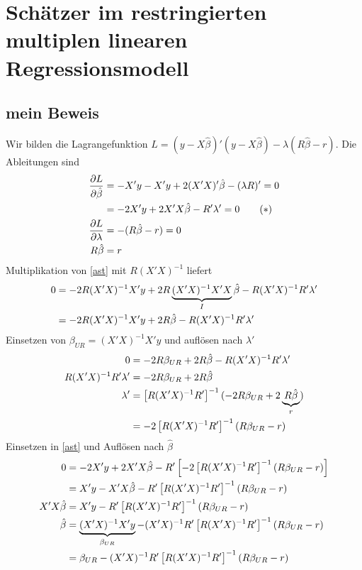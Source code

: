 \documentclass{article}
\begin{document}
	\section{Schätzer im restringierten multiplen linearen Regressionsmodell}
	\subsection{mein Beweis}
	Wir bilden die Lagrangefunktion $L=(y-X\hat{\beta})'(y-X\hat{\beta}) - \lambda(R\hat{\beta}-r)$. Die Ableitungen sind
	\begin{align}
		\frac{\partial L}{\partial \hat{\beta}} &= -X'y - X'y + 2(X'X)'\hat{\beta} - (\lambda R)' = 0 \notag \\
		\label{ast}
		&= -2X'y + 2X'X\hat{\beta} - R'\lambda' = 0 \tag{\textasteriskcentered} \\
		\frac{\partial L}{\partial\lambda} &= -(R\hat{\beta}-r)=0 \notag \\
		R\hat{\beta} &= r \notag
	\end{align}
	Multiplikation von \eqref{ast} mit $R(X'X)^{-1}$ liefert
	\begin{align}
		0 &= -2R(X'X)^{-1}X'y + 2R\underbrace{(X'X)^{-1}X'X}_{I}\hat{\beta} - R(X'X)^{-1}R'\lambda' \notag \\
		&= -2R(X'X)^{-1}X'y + 2R\hat{\beta} - R(X'X)^{-1}R'\lambda' \notag
	\end{align}
	Einsetzen von $\beta_{UR} = (X'X)^{-1}X'y$ und auflösen nach $\lambda'$
	\begin{align}
		0 &= -2R\beta_{UR} + 2R\hat{\beta} - R(X'X)^{-1}R'\lambda' \notag \\
		R(X'X)^{-1}R'\lambda' &= -2R\beta_{UR} + 2R\hat{\beta} \notag \\
		\lambda' &= \left[R(X'X)^{-1}R'\right]^{-1}(-2R\beta_{UR} + 2\underbrace{R\hat{\beta}}_{r}) \notag \\
		&= -2\left[R(X'X)^{-1}R'\right]^{-1}(R\beta_{UR} - r) \notag
	\end{align}
	Einsetzen in \eqref{ast} und Auflösen nach $\hat{\beta}$
	\begin{align}
		0 &= -2X'y + 2X'X\hat{\beta} - R'\left[-2\left[R(X'X)^{-1}R'\right]^{-1}(R\beta_{UR} - r)\right] \notag \\
		&= X'y - X'X\hat{\beta} - R'\left[R(X'X)^{-1}R'\right]^{-1}(R\beta_{UR} - r) \notag \\
		X'X\hat{\beta} &= X'y - R'\left[R(X'X)^{-1}R'\right]^{-1}(R\beta_{UR} - r) \notag \\
		\hat{\beta} &= \underbrace{(X'X)^{-1}X'y}_{\beta_{UR}} - (X'X)^{-1}R'\left[R(X'X)^{-1}R'\right]^{-1}(R\beta_{UR} - r) \notag \\
		&= \beta_{UR} - (X'X)^{-1}R'\left[R(X'X)^{-1}R'\right]^{-1}(R\beta_{UR} - r) \notag
	\end{align}
	
\end{document}
